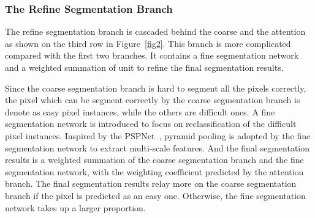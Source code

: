 \documentclass[10.5pt,compsoc]{TsT}
\newcommand{\upcite}[1]{\superscript{\textsuperscript{\cite{#1}}}}
\theoremstyle{mystyle}
\newcommand{\upcite}[1]{\textsuperscript{\cite{#1}}}
\begin{document}
{%


\subsubsection{The Refine Segmentation Branch}
\label{s:rsb}
\noindent

The refine segmentation branch is cascaded behind the coarse and the attention as shown on the third row in Figure~\ref{fig2}. This branch is more complicated compared with the first two branches. It contains a fine segmentation network and a weighted summation of unit to refine the final segmentation results.

Since the coarse segmentation branch is hard to segment all the pixels correctly, the pixel which can be segment correctly by the coarse segmentation branch is denote as easy pixel instances, while the others are difficult ones.
A fine segmentation network is introduced to focus on reclassification of the difficult pixel instances. Inspired by the PSPNet~\upcite{21}, pyramid pooling is adopted by the fine segmentation network to extract multi-scale features. And the final segmentation results is a weighted summation of the coarse segmentation branch and the fine segmentation network, with the weighting coefficient predicted by the attention branch. The final segmentation results relay more on the coarse segmentation branch if the pixel is predicted as an easy one. Otherwise, the fine segmentation network takes up a larger proportion. 

}
\end{document}

